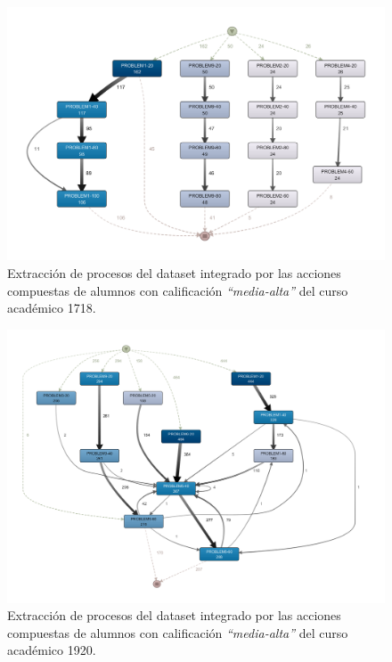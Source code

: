 \begin{figure}[H]
    \centering
    \includegraphics[width=1.25\textwidth]{imagenes/Year1718MidHighGrades.png}
    \caption{Extracción de procesos del dataset integrado por las acciones compuestas de alumnos con calificación \emph{``media-alta''} del curso académico 1718.}
    \label{fig:year1718MidHighGrades}
\end{figure}

\begin{figure}[H]
    \centering
    \includegraphics[width=1.25\textwidth]{imagenes/Year1920MidHighGrades.png}
    \caption{Extracción de procesos del dataset integrado por las acciones compuestas de alumnos con calificación \emph{``media-alta''} del curso académico 1920.}
    \label{fig:year1920MidHighGrades}
\end{figure}

